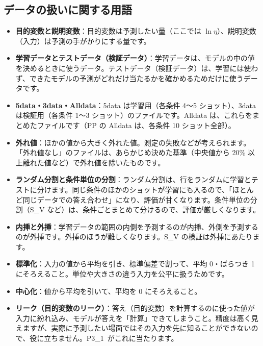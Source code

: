 \documentclass[paper=a4paper,fontsize=10.5pt,line_length=44zw,number_of_lines=38]{jlreq}
\newcommand{\PI}{P3\_1}
\newenvironment{termlist}{\begin{itemize}[label=・,leftmargin=1\zw,labelwidth=1\zw,labelsep=0pt,itemsep=0.4ex,topsep=0.6ex,parsep=0pt]}{\end{itemize}}
\newcommand{\term}[1]{\item \textbf{#1}：}
\begin{document}
\subsection{データの扱いに関する用語}
\begin{termlist}
\term{目的変数と説明変数}目的変数は予測したい量（ここでは $\ln\eta$）、説明変数（入力）は予測の手がかりにする量です。
\term{学習データとテストデータ（検証データ）}学習データは、モデルの中の値を決めるときに使うデータ。テストデータ（検証データ）は、学習には使わず、できたモデルの予測がどれだけ当たるかを確かめるためだけに使うデータです。
\term{5data・3data・Alldata}5data は学習用（各条件 4〜5 ショット）、3data は検証用（各条件 1〜3 ショット）のファイルです。Alldata は、これらをまとめたファイルです（PP の Alldata は、各条件 10 ショット全部）。
\term{外れ値}ほかの値から大きく外れた値。測定の失敗などが考えられます。「外れ値なし」のファイルは、あらかじめ決めた基準（中央値から 20\% 以上離れた値など）で外れ値を除いたものです。
\term{ランダム分割と条件単位の分割}ランダム分割は、行をランダムに学習とテストに分けます。同じ条件のほかのショットが学習にも入るので、「ほとんど同じデータでの答え合わせ」になり、評価が甘くなります。条件単位の分割（S\_V など）は、条件ごとまとめて分けるので、評価が厳しくなります。
\term{内挿と外挿}学習データの範囲の内側を予測するのが内挿、外側を予測するのが外挿です。外挿のほうが難しくなります。S\_V の検証は外挿にあたります。
\term{標準化}入力の値から平均を引き、標準偏差で割って、平均 0・ばらつき 1 にそろえること。単位や大きさの違う入力を公平に扱うためです。
\term{中心化}値から平均を引いて、平均を 0 にそろえること。
\term{リーク（目的変数のリーク）}答え（目的変数）を計算するのに使った値が入力に紛れ込み、モデルが答えを「計算」できてしまうこと。精度は高く見えますが、実際に予測したい場面ではその入力を先に知ることができないので、役に立ちません。\PI\ がこれに当たります。
\end{termlist}
\end{document}
